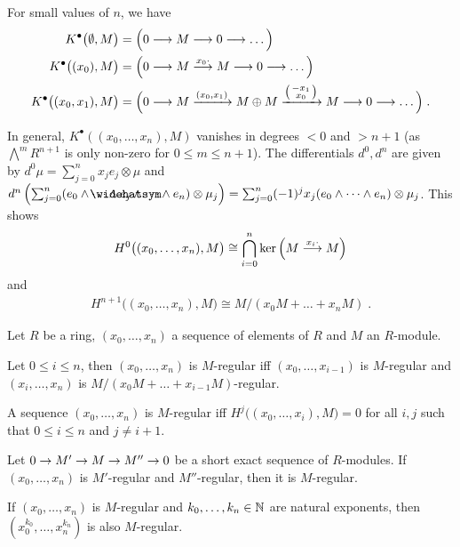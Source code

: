 \documentclass[a4paper,parskip=half,numbers=enddot, DIV=12]{scrreprt}
\renewcommand{\leq}{\leqslant}
\begin{document}
\begin{example}
	\begin{alphanumerate}
		\item {}For small values of $n$, we have
		\begin{align*}
			K^\bullet\big(\emptyset,M\big)&=\Big(0\morphism M\morphism 0\morphism\ldots\Big)\\
			K^\bullet\big((x_0),M\big)&=\Big(0\morphism M\morphism[x_0\cdot] M\morphism 0\morphism\ldots\Big)\\
			K^\bullet\big((x_0,x_1),M\big)&=\Big(0\morphism M\xrightarrow{(x_0,x_1)} M\oplus M\xrightarrow{\left(\begin{smallmatrix}
			-x_1\\
			x_0
			\end{smallmatrix}\right)} M\morphism 0\morphism\ldots\Big)\;.
		\end{align*}
		\item In general, $K^\bullet((x_0,\ldots,x_n),M)$ vanishes in degrees $<0$ and $>n+1$ (as $\bigwedge^mR^{n+1}$ is only non-zero for $0\leq m\leq n+1$). The differentials  $d^0,d^n$ are given by $d^0\mu=\sum_{j=0}^nx_je_j\otimes \mu$ and $d^n\left(\sum_{j=0}^n(e_0\wedge\cdots\wedge\roof{e}_j\wedge\cdots\wedge e_n)\otimes \mu_j\right)=\sum_{j=0}^n(-1)^jx_j (e_0\wedge\cdots\wedge e_n)\otimes\mu_j$. This shows
		\begin{align*}
			H^0\big((x_0,\ldots,x_n),M\big)\cong\bigcap_{i=0}^n\ker\left(M\morphism[x_i\cdot ]M\right)
		\end{align*}
		and
		\begin{align*}
			H^{n+1}\big((x_0,\ldots,x_n),M\big)\cong M/(x_0M+\ldots+x_nM)\;.
		\end{align*}
	\end{alphanumerate}
\end{example}
\begin{fact}
	Let $R$ be a ring, $(x_0,\ldots,x_n)$ a sequence of elements of $R$ and $M$ an $R$-module.
	\begin{alphanumerate}
		\item Let $0\leq i\leq n$, then $(x_0,\ldots,x_n)$ is $M$-regular iff $(x_0,\ldots,x_{i-1})$ is $M$-regular and $(x_i,\ldots,x_n)$ is $M/(x_0M+\ldots+x_{i-1}M)$-regular.
		\item A sequence $(x_0,\ldots,x_n)$ is $M$-regular iff $H^j\big((x_0,\ldots,x_i),M\big)=0$ for all $i,j$ such that $0\leq i\leq n$ and $j\neq i+1$.
		\item Let $0\morphism M'\morphism M\morphism M''\morphism 0$ be a short exact sequence of $R$-modules. If $(x_0,\ldots,x_n)$ is $M'$-regular and $M''$-regular, then it is $M$-regular.
		\item If $(x_0,\ldots,x_n)$ is $M$-regular and $k_0,\ldots,k_n\in \mathbb{N}$ are natural exponents, then $(x_0^{k_0},\ldots,x_n^{k_n})$ is also $M$-regular.
	\end{alphanumerate}
\end{fact}
\end{document}
